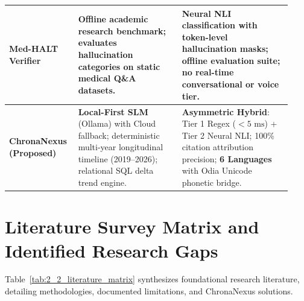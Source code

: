 \begin{longtable}{@{}p{0.21\linewidth} p{0.35\linewidth} p{0.37\linewidth}@{}}
\midrule
\textbf{Med-HALT Verifier}~\cite{umapathi2023medhalt} & Offline academic research benchmark; evaluates hallucination categories on static medical Q\&A datasets. & Neural NLI classification with token-level hallucination masks; offline evaluation suite; no real-time conversational or voice tier. \\
\midrule
\textbf{ChronaNexus (Proposed)} & \textbf{Local-First SLM} (Ollama) with Cloud fallback; deterministic multi-year longitudinal timeline (2019--2026); relational SQL delta trend engine. & \textbf{Asymmetric Hybrid}: Tier 1 Regex ($<5\text{ ms}$) + Tier 2 Neural NLI; 100\% citation attribution precision; \textbf{6 Languages} with Odia Unicode phonetic bridge. \\
\bottomrule
\end{longtable}
\normalsize


\section{Literature Survey Matrix and Identified Research Gaps}
\label{sec:lit_gaps_matrix}

Table~\ref{tab:2_2_literature_matrix} synthesizes foundational research literature, detailing methodologies, documented limitations, and ChronaNexus solutions.

